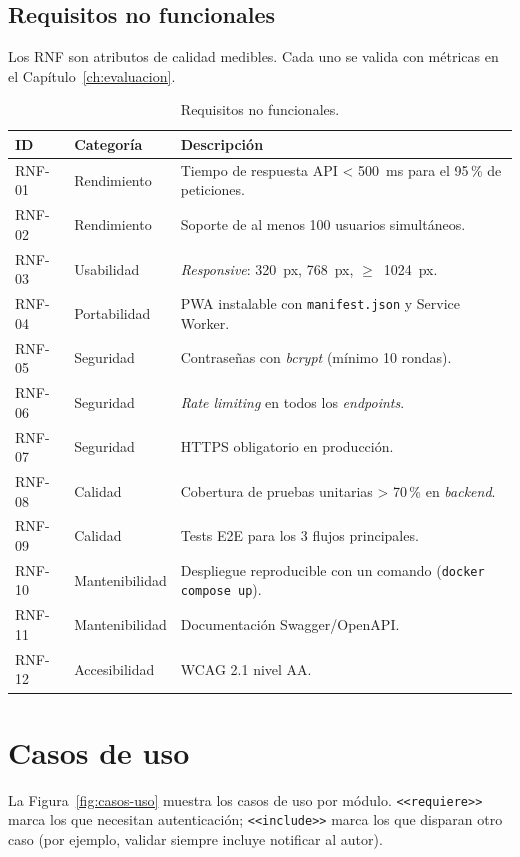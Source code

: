 \subsection{Requisitos no funcionales}
\label{subsec:rnf}

Los RNF son atributos de calidad medibles. Cada uno se valida con métricas en el Capítulo~\ref{ch:evaluacion}.

\begin{table}[H]
\centering
\caption{Requisitos no funcionales.}
\label{tab:rnf}
\small
\begin{tabular}{@{}L{1.3cm}L{2.8cm}L{9cm}@{}}
\toprule
\textbf{ID} & \textbf{Categoría} & \textbf{Descripción} \\
\midrule
RNF-01 & Rendimiento    & Tiempo de respuesta API < 500~ms para el 95\,\% de peticiones. \\
RNF-02 & Rendimiento    & Soporte de al menos 100 usuarios simultáneos. \\
RNF-03 & Usabilidad     & \textit{Responsive}: 320~px, 768~px, $\geq$~1024~px. \\
RNF-04 & Portabilidad   & PWA instalable con \texttt{manifest.json} y Service Worker. \\
RNF-05 & Seguridad      & Contraseñas con \textit{bcrypt} (mínimo 10 rondas). \\
RNF-06 & Seguridad      & \textit{Rate limiting} en todos los \textit{endpoints}. \\
RNF-07 & Seguridad      & HTTPS obligatorio en producción. \\
RNF-08 & Calidad        & Cobertura de pruebas unitarias > 70\,\% en \textit{backend}. \\
RNF-09 & Calidad        & Tests E2E para los 3 flujos principales. \\
RNF-10 & Mantenibilidad & Despliegue reproducible con un comando (\texttt{docker compose up}). \\
RNF-11 & Mantenibilidad & Documentación Swagger/OpenAPI. \\
RNF-12 & Accesibilidad  & WCAG 2.1 nivel AA. \\
\bottomrule
\end{tabular}
\end{table}


\section{Casos de uso}
\label{sec:casos-uso}

La Figura~\ref{fig:casos-uso} muestra los casos de uso por módulo. \texttt{<<requiere>>} marca los que necesitan autenticación; \texttt{<<include>>} marca los que disparan otro caso (por ejemplo, validar siempre incluye notificar al autor).

